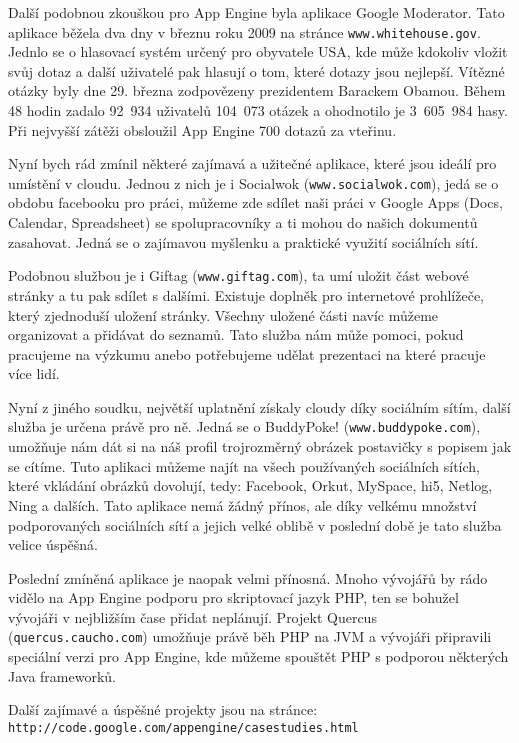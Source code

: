 Další podobnou zkouškou pro App Engine byla aplikace Google Moderator. Tato aplikace běžela dva dny v březnu roku 2009 na stránce \verb|www.whitehouse.gov|. Jednlo se o hlasovací systém určený pro obyvatele USA, kde může kdokoliv vložit svůj dotaz a další uživatelé pak hlasují o tom, které dotazy jsou nejlepší. Vítězné otázky byly dne 29. března zodpovězeny prezidentem Barackem Obamou. Během 48 hodin zadalo 92~934 uživatelů 104~073 otázek a ohodnotilo je 3~605~984 hasy. Při nejvyšší zátěži obsloužil App Engine 700 dotazů za vteřinu.

Nyní bych rád zmínil některé zajímavá a užitečné aplikace, které jsou ideálí pro umístění v cloudu. Jednou z nich je i Socialwok (\verb|www.socialwok.com|), jedá se o obdobu facebooku pro práci, můžeme zde sdílet naši práci v Google Apps (Docs, Calendar, Spreadsheet) se spolupracovníky a ti mohou do našich dokumentů zasahovat. Jedná se o zajímavou myšlenku a praktické využití sociálních sítí.

Podobnou službou je i Giftag (\verb|www.giftag.com|), ta umí uložit část webové stránky a tu pak sdílet s dalšími. Existuje doplněk pro internetové prohlížeče, který zjednoduší uložení stránky. Všechny uložené části navíc můžeme organizovat a přidávat do seznamů. Tato služba nám může pomoci, pokud pracujeme na výzkumu anebo potřebujeme udělat prezentaci na které pracuje více lidí.
 
Nyní z jiného soudku, největší uplatnění získaly cloudy díky sociálním sítím, další služba je určena právě pro ně. Jedná se o BuddyPoke! (\verb|www.buddypoke.com|), umožňuje nám dát si na náš profil trojrozměrný obrázek postavičky s popisem jak se cítíme. Tuto aplikaci můžeme najít na všech používaných sociálních sítích, které vkládání obrázků dovolují, tedy: Facebook, Orkut, MySpace, hi5, Netlog, Ning a dalších. Tato aplikace nemá žádný přínos, ale díky velkému množství podporovaných sociálních sítí a jejich velké oblibě v poslední době je tato služba velice úspěšná.

Poslední zmíněná aplikace je naopak velmi přínosná. Mnoho vývojářů by rádo vidělo na App Engine podporu pro skriptovací jazyk PHP, ten se bohužel vývojáři v nejbližším čase přidat neplánují. Projekt Quercus (\verb|quercus.caucho.com|) umožňuje právě běh PHP na JVM a vývojáři připravili speciální verzi pro App Engine, kde můžeme spouštět PHP s podporou některých Java frameworků.

Další zajímavé a úspěšné projekty jsou na stránce: \verb|http://code.google.com/appengine/casestudies.html|